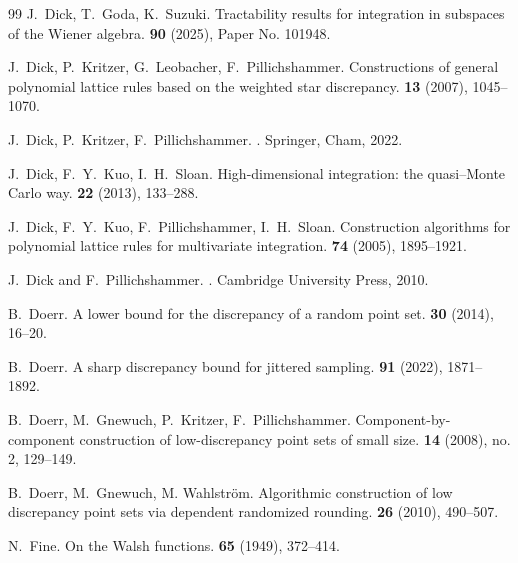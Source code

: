 \documentclass[12pt]{article}
\theoremstyle{definition}
\numberwithin{equation}{section}
\begin{document}
\begin{thebibliography}{99}
J.~Dick, T.~Goda, K.~Suzuki.
\newblock Tractability results for integration in subspaces of the Wiener algebra.
 \textbf{90} (2025), Paper No. 101948.

J.~Dick, P.~Kritzer, G.~Leobacher, F.~Pillichshammer.
\newblock Constructions of general polynomial lattice rules based on the weighted star discrepancy.
 \textbf{13} (2007), 1045--1070.


J.~Dick, P.~Kritzer, F.~Pillichshammer. 
. 
\newblock Springer, Cham, 2022.

J.~Dick, F.~Y.~Kuo, I.~H.~Sloan.
\newblock High-dimensional integration: the quasi--Monte Carlo way.
 \textbf{22} (2013), 133--288.



J.~Dick, F.~Y.~Kuo, F.~Pillichshammer, I.~H.~Sloan.
\newblock Construction algorithms for polynomial lattice rules for multivariate integration.
 \textbf{74} (2005), 1895--1921.



J.~Dick and F.~Pillichshammer.
.
\newblock Cambridge University Press, 2010.

B.~Doerr.
\newblock A lower bound for the discrepancy of a random point set.
 \textbf{30} (2014), 16--20.

B.~Doerr.
\newblock A sharp discrepancy bound for jittered sampling.
 \textbf{91} (2022), 1871--1892.

B.~Doerr, M.~Gnewuch, P.~Kritzer, F.~Pillichshammer.
\newblock Component-by-component construction of low-discrepancy point sets of small size.
 \textbf{14} (2008), no. 2, 129--149.

B.~Doerr, M.~Gnewuch, M. Wahlstr\"om.
\newblock Algorithmic construction of low discrepancy point sets via dependent randomized rounding.
 \textbf{26} (2010), 490--507. 

N.~Fine.
\newblock On the Walsh functions. 
 \textbf{65} (1949), 372--414.


\end{thebibliography}
\end{document}
